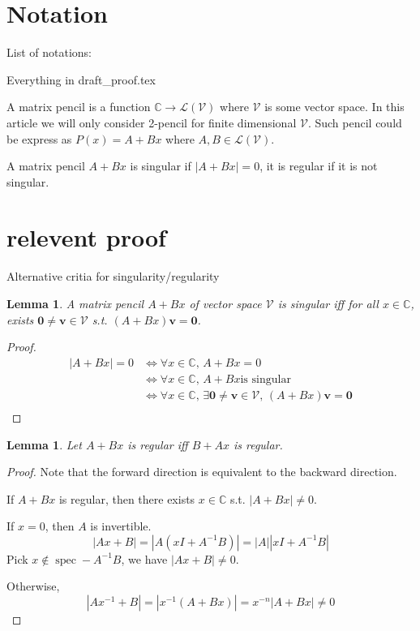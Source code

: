 \documentclass{article}
\newtheorem{lemma}[theorem]{Lemma}
\newcommand{\0}{\mathbf{0}}
\renewcommand{\vec}{\mathbf}
\newcommand{\vv}{\vec{v}}
\newcommand{\inv}{^{-1}}
\newcommand{\pen}[2]{#1+#2x}
\newcommand{\penAB}{\pen{A}{B}}
\newcommand{\C}{\mathbb{C}}
\newcommand{\vecspace}[1]{\mathcal{#1}}
\newcommand{\vsV}{\vecspace{V}}
\newcommand{\lmap}{\mathcal{L}}
\newcommand{\id}{I}
\DeclareMathOperator{\spec}{spec}
\begin{document}
\section{Notation}
List of notations:

Everything in draft\_proof.tex

A matrix pencil is a function $\C \to \lmap(\vsV)$ where $\vsV$ is some vector space.
In this article we will only consider 2-pencil for finite dimensional $\vsV$.
Such pencil could be express as $P(x)=\penAB$ where $A,B\in\lmap(\vsV)$.


A matrix pencil $\pen{A}{B}$ is singular if $|\pen{A}{B}|=0$, it is regular if it is not singular.

\section{relevent proof}

Alternative critia for singularity/regularity

\begin{lemma}
    \label{lemma:singular_from_vector}
    A matrix pencil $\penAB$ of vector space $\vsV$ is singular iff for all $x\in\C$, exists $\0\neq\vv\in\vsV$ s.t. $(\penAB)\vv=\0$.
\end{lemma}
\begin{proof}
    \begin{align*}
        |\pen{A}{B}|=0
        &\iff \forall x\in\C,\, A+Bx=0\\
        &\iff \forall x\in\C,\, A+Bx \text{is singular}\\
        &\iff \forall x\in\C,\, \exists \0\neq\vv\in\vsV,\, (A+Bx)\vv = \0\\
    \end{align*}
\end{proof}


\begin{lemma}
    \label{lemma:regular_symm}
    Let $A+Bx$ is regular iff $B+Ax$ is regular.
\end{lemma}
\begin{proof}
    Note that the forward direction is equivalent to the backward direction.

    If $A+Bx$ is regular, then there exists $x\in\C$ s.t. $|A+Bx|\neq0$.

    If $x=0$, then $A$ is invertible.
    \begin{equation*}
        |Ax+B|=|A(x\id+A\inv B)|=|A||x\id+A\inv B|
    \end{equation*}
    Pick $x\notin\spec -A\inv B$, we have $|Ax+B|\neq0$.

    Otherwise,
    \begin{equation*}
        |Ax\inv+B|=|x\inv(A+Bx)|=x^{-n}|A+Bx|\neq0
    \end{equation*}
\end{proof}
\end{document}
